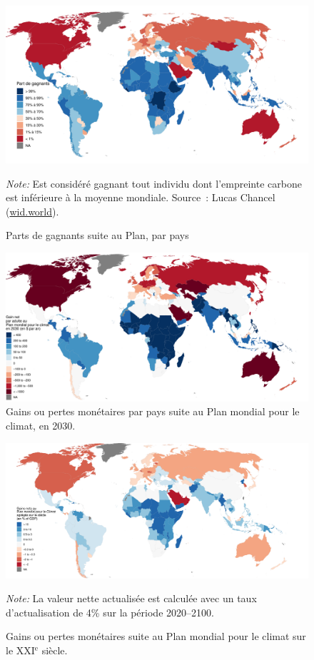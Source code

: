 \documentclass[a5paper,french]{memoir}
\begin{document}
\begin{figure}[h]
  \caption{Parts de gagnants suite au Plan, par pays}\label{fig:share_below_global_mean}
  \centerline{
    \includegraphics[width=.8\paperwidth]{../figures/maps/share_below_global_mean.pdf}
    } 
  {\footnotesize \textit{Note:} Est considéré gagnant tout individu dont l'empreinte carbone est inférieure à la moyenne mondiale. Source~: Lucas Chancel (\href{http://wid.world}{wid.world}).}
\end{figure}
\begin{figure}[h]
  \caption{Gains ou pertes monétaires par pays suite au Plan mondial pour le climat, en 2030.}\label{fig:gain_2030}
  \centerline{\includegraphics[width=.8\paperwidth]{../figures/maps/gain_adj_2030_fr.pdf}} %
\end{figure}

\begin{figure}
  \caption{Gains ou pertes monétaires suite au Plan mondial pour le climat sur le XXI$^\text{e}$ siècle.}\label{fig:gain_npv}
  \centerline{\includegraphics[width=\paperheight]{../figures/maps/npv_over_gdp_gcs_adj_fr.pdf}
    } %
  {\footnotesize \textit{Note:} La valeur nette actualisée est calculée avec un taux d'actualisation de 4\% sur la période 2020--2100.}
\end{figure}
\end{document}

